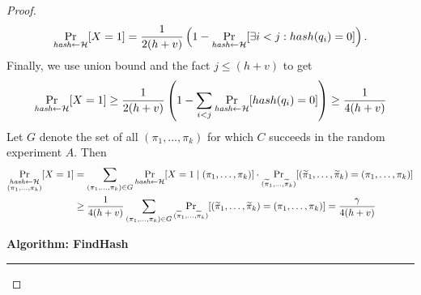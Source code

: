 \begin{proof}
\begin{align*}
\underset{\textit{hash} \leftarrow \mathcal{H}}{\Pr}[X=1] = \frac{1}{2(h+v)} \left( 1 -\underset{\textit{hash} \leftarrow \mathcal{H}}{\Pr}[\exists i < j : hash(q_i) = 0] \right).
\end{align*}
Finally, we use union bound and the fact $j \leq (h+v)$ to get
\begin{align*}
\underset{\textit{hash} \leftarrow \mathcal{H}}{\Pr}[X=1] \geq
\frac{1}{2(h+v)} \left( 1 - \sum_{i < j} \underset{\textit{hash} \leftarrow \mathcal{H}}{\Pr}[hash(q_i) = 0] \right) \geq \frac{1}{4(h+v)}
\end{align*}
Let $G$ denote the set of all $(\pi_1, \dots, \pi_k)$ for which $C$ succeeds in the random experiment $A$.
Then
\begin{align*}
\underset{\substack{\textit{hash} \leftarrow \mathcal{H} \\ (\pi_1, \dots, \pi_k)}}{\Pr}[X=1] &=
\sum_{(\pi_1, \dots, \pi_k) \in G} \underset{\textit{hash} \leftarrow \mathcal{H}}{\Pr}[X=1 \mid (\pi_1, \dots, \pi_k)] \cdot \underset{(\widetilde{\pi}_1, \dots, \widetilde{\pi}_k)}{\Pr}[(\widetilde{\pi}_1, \dots, \widetilde{\pi}_k) = (\pi_1, \dots, \pi_k)]\\
&\geq \frac{1}{4(h+v)} \sum_{(\pi_1, \dots, \pi_k) \in G} \underset{(\widetilde{\pi}_1, \dots, \widetilde{\pi}_k)}{\Pr}[(\widetilde{\pi}_1, \dots, \widetilde{\pi}_k) = (\pi_1, \dots, \pi_k)] = \frac{\gamma}{4(h+v)}
\end{align*}

\begin{codeblock}
  \textbf{Algorithm: FindHash}

  \medskip

  \hrule

  \medskip


\end{codeblock}
\end{proof}
